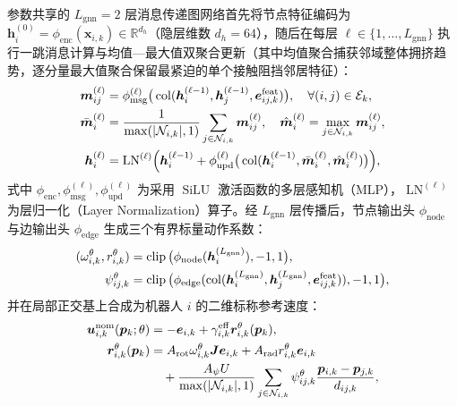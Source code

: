 参数共享的 $L_{\mathrm{gnn}}=2$ 层消息传递图网络首先将节点特征编码为 $\boldsymbol h_i^{(0)}=\phi_{\mathrm{enc}}(\boldsymbol x_{i,k})\in\mathbb R^{d_h}$（隐层维数 $d_h=64$），随后在每层 $\ell\in\{1,\dots,L_{\mathrm{gnn}}\}$ 执行一跳消息计算与均值—最大值双聚合更新（其中均值聚合捕获邻域整体拥挤趋势，逐分量最大值聚合保留最紧迫的单个接触阻挡邻居特征）：
\begin{equation}
\begin{split}
 \boldsymbol m_{ij}^{(\ell)}&=\phi_{\mathrm{msg}}^{(\ell)}\big(\operatorname{col}(\boldsymbol h_i^{(\ell-1)},\boldsymbol h_j^{(\ell-1)},\boldsymbol e_{ij,k}^{\mathrm{feat}})\big),\quad\forall (i,j)\in\mathcal E_k,\\
 \bar{\boldsymbol m}_i^{(\ell)}&=\frac{1}{\max(|\mathcal N_{i,k}|,1)}\sum_{j\in\mathcal N_{i,k}}\boldsymbol m_{ij}^{(\ell)},\quad
 \hat{\boldsymbol m}_i^{(\ell)}=\max_{j\in\mathcal N_{i,k}}\boldsymbol m_{ij}^{(\ell)},\\
 \boldsymbol h_i^{(\ell)}&=\operatorname{LN}^{(\ell)}\!\Big(\boldsymbol h_i^{(\ell-1)}+\phi_{\mathrm{upd}}^{(\ell)}\big(\operatorname{col}(\boldsymbol h_i^{(\ell-1)},\bar{\boldsymbol m}_i^{(\ell)},\hat{\boldsymbol m}_i^{(\ell)})\big)\Big),
\end{split}\label{eq:gnn-layer}
\end{equation}
式中 $\phi_{\mathrm{enc}},\phi_{\mathrm{msg}}^{(\ell)},\phi_{\mathrm{upd}}^{(\ell)}$ 为采用 $\operatorname{SiLU}$ 激活函数的多层感知机（MLP），$\operatorname{LN}^{(\ell)}$ 为层归一化（Layer Normalization）算子。经 $L_{\mathrm{gnn}}$ 层传播后，节点输出头 $\phi_{\mathrm{node}}$ 与边输出头 $\phi_{\mathrm{edge}}$ 生成三个有界标量动作系数：
\begin{equation}
\begin{split}
 (\omega_{i,k}^\theta,r_{i,k}^\theta)&=\operatorname{clip}\big(\phi_{\mathrm{node}}(\boldsymbol h_i^{(L_{\mathrm{gnn}})}),-1,1\big),\\
 \psi_{ij,k}^\theta&=\operatorname{clip}\big(\phi_{\mathrm{edge}}(\operatorname{col}(\boldsymbol h_i^{(L_{\mathrm{gnn}})},\boldsymbol h_j^{(L_{\mathrm{gnn}})},\boldsymbol e_{ij,k}^{\mathrm{feat}})),-1,1\big),
\end{split}
 \label{eq:action-heads}
\end{equation}
并在局部正交基上合成为机器人 $i$ 的二维标称参考速度：
\begin{equation}
\begin{split}
 \boldsymbol{u}_{i,k}^{\mathrm{nom}}(\boldsymbol{p}_k;\theta)&=-\boldsymbol{e}_{i,k}+\gamma_{i,k}^{\mathrm{eff}}\boldsymbol{r}_{i,k}^\theta(\boldsymbol{p}_k),\\
 \boldsymbol{r}_{i,k}^\theta(\boldsymbol{p}_k)&=A_{\mathrm{rot}}\omega_{i,k}^\theta\boldsymbol{J}\boldsymbol{e}_{i,k}+A_{\mathrm{rad}}r_{i,k}^\theta\boldsymbol{e}_{i,k}\\
 &\quad+\frac{A_\psi U}{\max(|\mathcal N_{i,k}|,1)}\sum_{j\in\mathcal N_{i,k}}\psi_{ij,k}^\theta\frac{\boldsymbol{p}_{i,k}-\boldsymbol{p}_{j,k}}{d_{ij,k}},
\end{split}\label{eq:nominal-law}
\end{equation}
